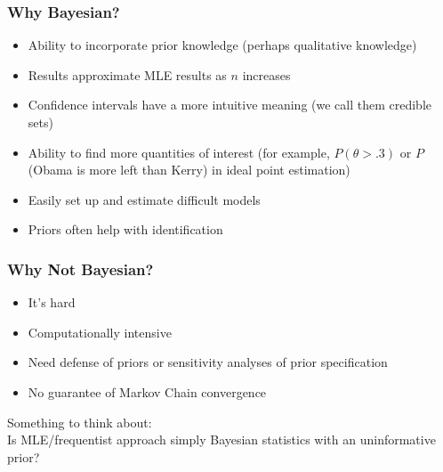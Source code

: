 \documentclass{beamer}
\begin{document}
\begin{frame}
\frametitle{Why Bayesian?}
\pause
\begin{itemize}
\item Ability to incorporate prior knowledge (perhaps qualitative knowledge)
\pause
\item Results approximate MLE results as $n$ increases
\pause
\item Confidence intervals have a more intuitive meaning (we call them
credible sets)
\pause
\item Ability to find more quantities of interest (for example,
$P(\theta > .3)$ or $P$(Obama is more left than Kerry) in ideal point estimation)
\pause 
\item Easily set up and estimate difficult models
\pause
\item Priors often help with identification
\end{itemize}
\end{frame}

\begin{frame}
\frametitle{Why Not Bayesian?}
\pause
\begin{itemize}
\item It's hard
\pause
\item Computationally intensive
\pause
\item Need defense of priors or sensitivity analyses of prior specification
\pause
\item No guarantee of Markov Chain convergence
\end{itemize}
\pause
\bigskip
Something to think about:\\
\bigskip
Is MLE/frequentist approach simply Bayesian statistics with an uninformative prior?
\end{frame}
\end{document}
